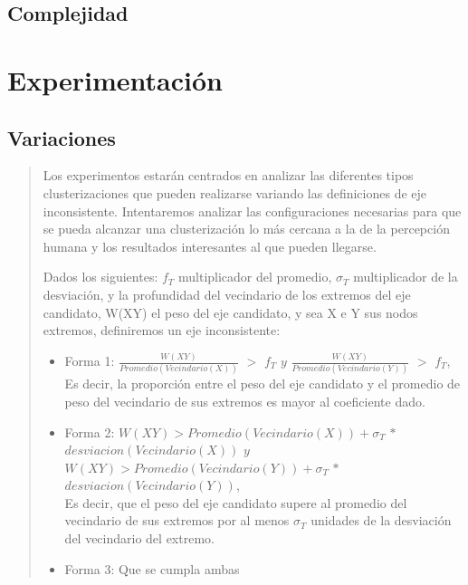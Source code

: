 \documentclass[8pt,a4paper]{article}
\begin{document}
\subsection{Complejidad}

\section{Experimentación}

\subsection{Variaciones}
\begin{verse}
Los experimentos estarán centrados en analizar las diferentes tipos clusterizaciones que pueden realizarse variando las definiciones de eje inconsistente. Intentaremos analizar las configuraciones necesarias para que se pueda alcanzar una clusterización lo más cercana a la de la percepción humana y los resultados interesantes al que pueden llegarse.

Dados los siguientes: $f_{T}$ multiplicador del promedio, $\sigma_{T}$ multiplicador de la desviación, y la profundidad del vecindario de los extremos del eje candidato, W(XY) el peso del eje candidato, y sea X e Y sus nodos extremos, definiremos un eje inconsistente:
\begin{itemize}
\item Forma 1: $\frac{W(XY)}{Promedio(Vecindario(X))}$ $>$ $f_{T}$ $  y $ $\frac{W(XY)}{Promedio(Vecindario(Y))}$ $>$ $f_{T}$, \\Es decir, la proporción entre el peso del eje candidato y el promedio de peso del vecindario de sus extremos es mayor al coeficiente dado.
\item Forma 2: $W(XY) >  Promedio(Vecindario(X)) + \sigma_{T}$ $ * $ $ desviacion(Vecindario(X)) $ $ y$ $W(XY) >  Promedio(Vecindario(Y)) + \sigma_{T}$ $ * $ $ desviacion(Vecindario(Y)) $, \\Es decir, que el peso del eje candidato supere al promedio del vecindario de sus extremos por al menos $\sigma_{T}$ unidades de la desviación del vecindario del extremo.

\item Forma 3: Que se cumpla ambas
\end{itemize}





\end{verse}
\end{document}
